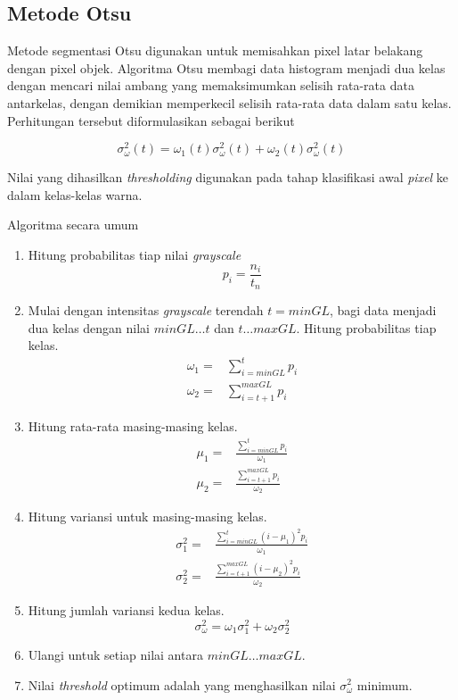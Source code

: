 \documentclass[laporan.tex]{subfiles}
\begin{document}
\subsection{Metode Otsu}

Metode segmentasi Otsu digunakan untuk memisahkan pixel latar belakang dengan pixel objek. Algoritma Otsu membagi data histogram menjadi dua kelas dengan mencari nilai ambang yang memaksimumkan selisih rata-rata data antarkelas, dengan demikian memperkecil selisih rata-rata data dalam satu kelas. Perhitungan tersebut diformulasikan sebagai berikut

\begin{equation}
	\sigma_{\omega}^2 (t) = \omega_1 (t) \sigma_{\omega}^2 (t) + \omega_2 (t) \sigma_{\omega}^2 (t)
\end{equation}

Nilai yang dihasilkan \emph{thresholding} digunakan pada tahap klasifikasi awal \emph{pixel} ke dalam kelas-kelas warna.

Algoritma secara umum
\begin{enumerate}
\item Hitung probabilitas tiap nilai \emph{grayscale}
\begin{equation}
	p_i = \frac{n_i}{t_n}
\end{equation}
\item Mulai dengan intensitas \emph{grayscale} terendah $t=minGL$, bagi data menjadi dua kelas dengan nilai $minGL \ldots t$ dan $t \ldots maxGL$. Hitung probabilitas tiap kelas.
\begin{align}
	\omega_1 = & \sum_{i=minGL}^t p_i \\
	\omega_2 = & \sum_{i=t+1}^{maxGL} p_i
\end{align}
\item Hitung rata-rata masing-masing kelas.
\begin{align}
	\mu_1 = & \frac{\sum_{i=minGL}^t p_i}{\omega_1} \\
	\mu_2 = & \frac{\sum_{i=t+1}^{maxGL} p_i}{\omega_2}
\end{align}
\item Hitung variansi untuk masing-masing kelas.
\begin{align}
	\sigma_1^2 = & \frac{\sum_{i=minGL}^t (i - \mu_1)^2 p_i}{\omega_1} \\
	\sigma_2^2 = & \frac{\sum_{i=t+1}^{maxGL} (i - \mu_2)^2 p_i}{\omega_2}
\end{align}
\item Hitung jumlah variansi kedua kelas.
\begin{equation}
	\sigma_{\omega}^2 = \omega_1 \sigma_1^2 + \omega_2 \sigma_2^2
\end{equation}
\item Ulangi untuk setiap nilai antara $minGL \ldots maxGL$.
\item Nilai \emph{threshold} optimum adalah yang menghasilkan nilai $\sigma_{\omega}^2$ minimum.
\end{enumerate}
\end{document}
